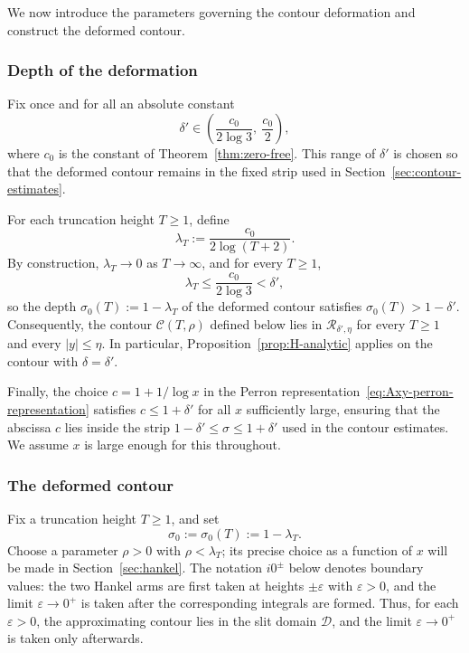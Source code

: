 We now introduce the parameters governing the contour deformation
and construct the deformed contour.

\subsubsection*{Depth of the deformation}

Fix once and for all an absolute constant
\begin{equation}\label{eq:delta-prime}
    \delta' \in \left( \frac{c_0}{2 \log 3},\ \frac{c_0}{2} \right),
\end{equation}
where $c_0$ is the constant of Theorem~\ref{thm:zero-free}. This range of $\delta'$
is chosen so that the deformed contour remains in the fixed strip
used in Section~\ref{sec:contour-estimates}.

For each truncation height $T \geq 1$, define
\begin{equation}\label{eq:lambda-T}
    \lambda_T := \frac{c_0}{2 \log(T + 2)}.
\end{equation}
By construction, $\lambda_T \to 0$ as $T \to \infty$, and for
every $T \geq 1$,
\begin{equation}\label{eq:lambda-T-bound}
    \lambda_T \leq \frac{c_0}{2 \log 3} < \delta',
\end{equation}
so the depth $\sigma_0(T) := 1 - \lambda_T$ of the deformed
contour satisfies $\sigma_0(T) > 1 - \delta'$. Consequently, the
contour $\mathcal{C}(T, \rho)$ defined below lies in
$\mathcal{R}_{\delta', \eta}$ for every $T \geq 1$ and every
$|y| \leq \eta$. In particular,
Proposition~\ref{prop:H-analytic} applies on the contour with
$\delta = \delta'$.

Finally, the choice $c = 1 + 1/\log x$ in the Perron
representation~\eqref{eq:Axy-perron-representation} satisfies
$c \leq 1 + \delta'$
for all $x$ sufficiently large, ensuring that the abscissa $c$
lies inside the strip $1 - \delta' \leq \sigma \leq 1 + \delta'$
used in the contour estimates. We assume $x$ is large enough for this throughout.

\subsubsection*{The deformed contour}

Fix a truncation height $T \geq 1$, and set
\begin{equation}\label{eq:sigma0-T}
    \sigma_0 := \sigma_0(T) := 1 - \lambda_T.
\end{equation}
Choose a parameter $\rho>0$ with $\rho<\lambda_T$; its precise
choice as a function of $x$ will be made in Section~\ref{sec:hankel}.
The notation $i0^\pm$ below denotes boundary values: the two
Hankel arms are first taken at heights $\pm\varepsilon$ with
$\varepsilon>0$, and the limit $\varepsilon\to0^+$ is taken after
the corresponding integrals are formed. Thus, for each $\varepsilon > 0$, the approximating contour lies in the slit domain $\mathcal{D}$, and the limit $\varepsilon \to 0^+$ is taken only afterwards.

